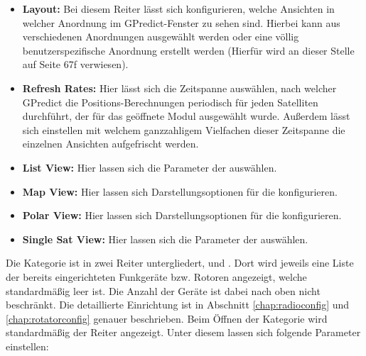 \begin{itemize}
	\parskip0pt
	\item \textbf{Layout:} Bei diesem Reiter lässt sich konfigurieren, welche Ansichten in welcher Anordnung im GPredict-Fenster zu sehen sind. Hierbei kann aus verschiedenen Anordnungen ausgewählt werden oder eine völlig benutzerspezifische Anordnung erstellt werden (Hierfür wird an dieser Stelle auf \cite{gpredictmanual} Seite 67f verwiesen).
	\item \textbf{Refresh Rates:} Hier lässt sich die Zeitspanne auswählen, nach  welcher GPredict die Positions-Berechnungen periodisch für jeden Satelliten durchführt, der für das geöffnete Modul ausgewählt wurde. Außerdem lässt sich einstellen mit welchem ganzzahligem Vielfachen dieser Zeitspanne die einzelnen Ansichten aufgefrischt werden.
	\item \textbf{List View:} Hier lassen sich die Parameter der  auswählen.
	\item \textbf{Map View:} Hier lassen sich Darstellungsoptionen für die  konfigurieren.
	\item \textbf{Polar View:} Hier lassen sich Darstellungsoptionen für die  konfigurieren.
	\item \textbf{Single Sat View:} Hier lassen sich die Parameter der  auswählen.
\end{itemize}

Die Kategorie  ist in zwei Reiter untergliedert,  und . Dort wird jeweils eine Liste der bereits eingerichteten Funkgeräte bzw. Rotoren angezeigt, welche standardmäßig leer ist. Die Anzahl der Geräte ist dabei nach oben nicht beschränkt. Die detaillierte Einrichtung ist in Abschnitt \ref{chap:radioconfig} und \ref{chap:rotatorconfig} genauer beschrieben.\newpar
Beim Öffnen der Kategorie  wird standardmäßig der Reiter  angezeigt. Unter diesem lassen sich folgende Parameter einstellen:

